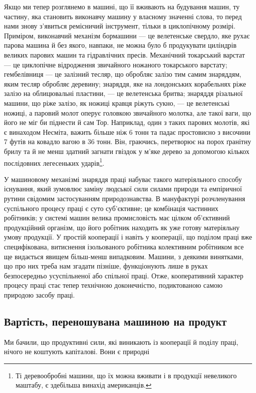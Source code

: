 
Якщо ми тепер розглянемо в машині, що її вживають на будування
машин, ту частину, яка становить виконавчу машину у
власному значенні слова, то перед нами знову з’явиться ремісничий
інструмент, тільки в циклопічному розмірі. Приміром, виконавчий
механізм бормашини — це велетенське свердло, яке рухає
парова машина й без якого, навпаки, не можна було б продукувати
циліндрів великих парових машин та гідравлічних пресів.
Механічний токарський варстат — це циклопічне відродження
звичайного ножаного токарського варстату; гембелівниця — це
залізний тесляр, що обробляє залізо тим самим знаряддям, яким
тесляр обробляє деревину; знаряддя, яке на лондонських корабельнях
ріже залізо на облицювальні пластини, — це велетенська
бритва; знаряддя різальної машини, що ріже залізо, як ножиці
кравця ріжуть сукно, — це велетенські ножиці, а паровий молот
оперує головкою звичайного молотка, але такої ваги, що його
не міг би піднести й сам Тор. Наприклад, один з таких парових
молотів, які є винаходом Несміта, важить більше ніж 6 тонн
та падає простовисно з височини 7 футів на ковадло вагою в
36 тонн. Він, граючись, перетворює на порох ґранітну брилу та
й не менш здатний загнати гвіздок у м’яке дерево за допомогою
кількох послідовних легесеньких ударів\footnote{
Ті деревообробні машини, що їх можна вживати і в продукції
невеликого маштабу, є здебільша винахід американців.
}.

У машиновому механізмі знаряддя праці набуває такого матеріяльного
способу існування, який зумовлює заміну людської
сили силами природи та емпіричної рутини свідомим застосуванням
природознавства. В мануфактурі розчленування суспільного
процесу праці є суто суб’єктивне; це комбінація частинних робітників;
у системі машин велика промисловість має цілком об’єктивний
продукційний організм, що його робітник находить як
уже готову матеріяльну умову продукції. У простій кооперації і
навіть у кооперації, що поділом праці вже специфікована, витиснення
ізольованого робітника колективним робітником все ще
видається явищем більш-менш випадковим. Машини, з деякими
винятками, що про них треба нам згадати пізніше, функціонують
лише в руках безпосередньо усуспільненої або спільної праці.
Отже, кооперативний характер процесу праці стає тепер технічною
доконечністю, подиктованою самою природою засобу праці.

\vspace{-4\smallskipamount}
\subsection{Вартість, переношувана машиною на продукт}
\vspace{-2\smallskipamount}

\enlargethispage{\baselineskip}
Ми бачили, що продуктивні сили, які виникають із кооперації
й поділу праці, нічого не коштують капіталові. Вони є природні
\parbreak{}  %
